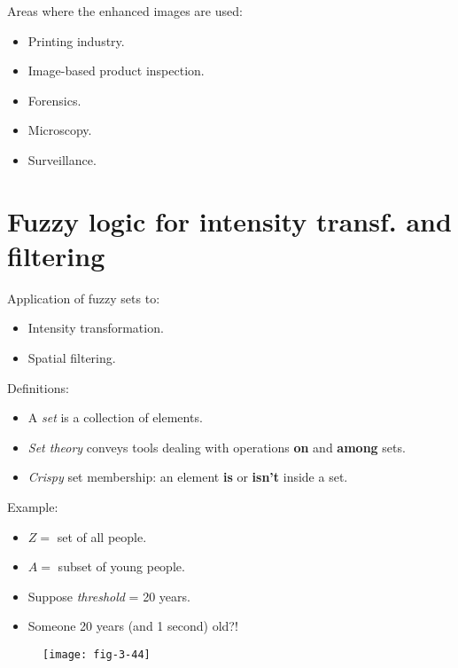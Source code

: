 \begin{frame}
Areas where the enhanced images are used:
\begin{itemize}
\item Printing industry.
\item Image-based product inspection.
\item Forensics.
\item Microscopy.
\item Surveillance.
\end{itemize}
\end{frame}



\section{Fuzzy logic for intensity transf. and filtering}


\begin{frame}
Application of fuzzy sets to:
\begin{itemize}
\item Intensity transformation.
\item Spatial filtering.
\end{itemize}
Definitions:
\begin{itemize}
\item A \textit{set} is a collection of elements.
\item \textit{Set theory} conveys tools dealing with operations \textbf{on} and \textbf{among} sets.
\item \textit{Crispy} set membership: an element \textbf{is} or \textbf{isn't} inside a set.
\end{itemize}
\end{frame}


\begin{frame}
Example:
\begin{itemize}
\item $Z =$ set of all people.
\item $A = $ subset of young people.
\item Suppose \textit{threshold} = 20 years.
\item Someone 20 years (and 1 second) old?!
\end{itemize}
\begin{figure}
\centering
\texttt{[image: fig-3-44]}
\end{figure}
\end{frame}

